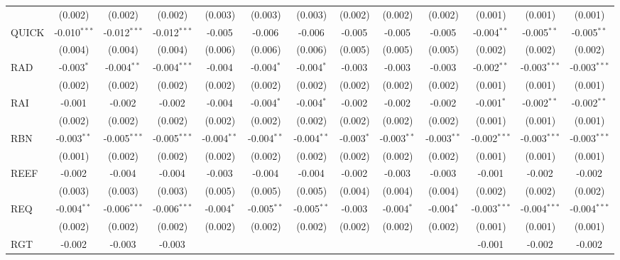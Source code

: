 \begin{table}[!htbp]
\begin{tabular}{@{\extracolsep{5pt}}lcccccccccccc}
  & (0.002) & (0.002) & (0.002) & (0.003) & (0.003) & (0.003) & (0.002) & (0.002) & (0.002) & (0.001) & (0.001) & (0.001) \\
 QUICK & -0.010$^{***}$ & -0.012$^{***}$ & -0.012$^{***}$ & -0.005$^{}$ & -0.006$^{}$ & -0.006$^{}$ & -0.005$^{}$ & -0.005$^{}$ & -0.005$^{}$ & -0.004$^{**}$ & -0.005$^{**}$ & -0.005$^{**}$ \\
  & (0.004) & (0.004) & (0.004) & (0.006) & (0.006) & (0.006) & (0.005) & (0.005) & (0.005) & (0.002) & (0.002) & (0.002) \\
 RAD & -0.003$^{*}$ & -0.004$^{**}$ & -0.004$^{***}$ & -0.004$^{}$ & -0.004$^{*}$ & -0.004$^{*}$ & -0.003$^{}$ & -0.003$^{}$ & -0.003$^{}$ & -0.002$^{**}$ & -0.003$^{***}$ & -0.003$^{***}$ \\
  & (0.002) & (0.002) & (0.002) & (0.002) & (0.002) & (0.002) & (0.002) & (0.002) & (0.002) & (0.001) & (0.001) & (0.001) \\
 RAI & -0.001$^{}$ & -0.002$^{}$ & -0.002$^{}$ & -0.004$^{}$ & -0.004$^{*}$ & -0.004$^{*}$ & -0.002$^{}$ & -0.002$^{}$ & -0.002$^{}$ & -0.001$^{*}$ & -0.002$^{**}$ & -0.002$^{**}$ \\
  & (0.002) & (0.002) & (0.002) & (0.002) & (0.002) & (0.002) & (0.002) & (0.002) & (0.002) & (0.001) & (0.001) & (0.001) \\
 RBN & -0.003$^{**}$ & -0.005$^{***}$ & -0.005$^{***}$ & -0.004$^{**}$ & -0.004$^{**}$ & -0.004$^{**}$ & -0.003$^{*}$ & -0.003$^{**}$ & -0.003$^{**}$ & -0.002$^{***}$ & -0.003$^{***}$ & -0.003$^{***}$ \\
  & (0.001) & (0.002) & (0.002) & (0.002) & (0.002) & (0.002) & (0.002) & (0.002) & (0.002) & (0.001) & (0.001) & (0.001) \\
 REEF & -0.002$^{}$ & -0.004$^{}$ & -0.004$^{}$ & -0.003$^{}$ & -0.004$^{}$ & -0.004$^{}$ & -0.002$^{}$ & -0.003$^{}$ & -0.003$^{}$ & -0.001$^{}$ & -0.002$^{}$ & -0.002$^{}$ \\
  & (0.003) & (0.003) & (0.003) & (0.005) & (0.005) & (0.005) & (0.004) & (0.004) & (0.004) & (0.002) & (0.002) & (0.002) \\
 REQ & -0.004$^{**}$ & -0.006$^{***}$ & -0.006$^{***}$ & -0.004$^{*}$ & -0.005$^{**}$ & -0.005$^{**}$ & -0.003$^{}$ & -0.004$^{*}$ & -0.004$^{*}$ & -0.003$^{***}$ & -0.004$^{***}$ & -0.004$^{***}$ \\
  & (0.002) & (0.002) & (0.002) & (0.002) & (0.002) & (0.002) & (0.002) & (0.002) & (0.002) & (0.001) & (0.001) & (0.001) \\
 RGT & -0.002$^{}$ & -0.003$^{}$ & -0.003$^{}$ & & & & & & & -0.001$^{}$ & -0.002$^{}$ & -0.002$^{}$ \\

\end{tabular}
\end{table}

